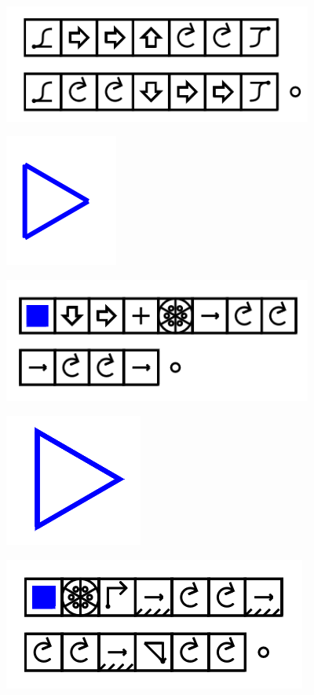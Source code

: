 \documentclass[11pt]{article}
\begin{document}
\includegraphics[width=4in]{image28.png}













\includegraphics{image29.png}

\includegraphics[width=4in]{image30.png}

\includegraphics{image31.png}

\includegraphics{image32.png}
\end{document}
